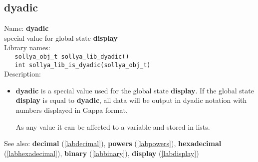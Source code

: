 \subsection{dyadic}
\label{labdyadic}
\noindent Name: \textbf{dyadic}\\
\phantom{aaa}special value for global state \textbf{display}\\[0.2cm]
\noindent Library names:\\
\verb|   sollya_obj_t sollya_lib_dyadic()|\\
\verb|   int sollya_lib_is_dyadic(sollya_obj_t)|\\[0.2cm]
\noindent Description: \begin{itemize}

\item \textbf{dyadic} is a special value used for the global state \textbf{display}.
   If the global state \textbf{display} is equal to \textbf{dyadic}, all data will
   be output in dyadic notation with numbers displayed in Gappa format.
    
   As any value it can be affected to a variable and stored in lists.
\end{itemize}
See also: \textbf{decimal} (\ref{labdecimal}), \textbf{powers} (\ref{labpowers}), \textbf{hexadecimal} (\ref{labhexadecimal}), \textbf{binary} (\ref{labbinary}), \textbf{display} (\ref{labdisplay})
